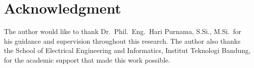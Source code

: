 \section*{Acknowledgment}

The author would like to thank Dr.\ Phil.\ Eng.\ Hari Purnama, S.Si., M.Si.\
for his guidance and supervision throughout this research. The author also
thanks the School of Electrical Engineering and Informatics, Institut
Teknologi Bandung, for the academic support that made this work possible.